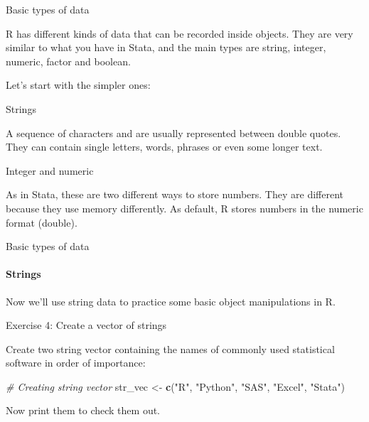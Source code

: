 \documentclass[ignorenonframetext,]{beamer}
\newenvironment{Shaded}{\begin{snugshade}}{\end{snugshade}}
\newcommand{\KeywordTok}[1]{\textcolor[rgb]{0.13,0.29,0.53}{\textbf{#1}}}
\newcommand{\StringTok}[1]{\textcolor[rgb]{0.31,0.60,0.02}{#1}}
\newcommand{\CommentTok}[1]{\textcolor[rgb]{0.56,0.35,0.01}{\textit{#1}}}
\newcommand{\NormalTok}[1]{#1}
\begin{document}
\begin{frame}{Basic types of data}

R has different kinds of data that can be recorded inside objects. They
are very similar to what you have in Stata, and the main types are
string, integer, numeric, factor and boolean.

Let's start with the simpler ones:

\begin{block}{Strings}

A sequence of characters and are usually represented between double
quotes. They can contain single letters, words, phrases or even some
longer text.

\end{block}

\begin{block}{Integer and numeric}

As in Stata, these are two different ways to store numbers. They are
different because they use memory differently. As default, R stores
numbers in the numeric format (double).

\end{block}

\end{frame}

\begin{frame}[fragile]{Basic types of data}

\framesubtitle{Strings}

Now we'll use string data to practice some basic object manipulations in
R.

\begin{block}{Exercise 4: Create a vector of strings}

Create two string vector containing the names of commonly used
statistical software in order of importance:

\begin{Shaded}
\begin{Highlighting}[]
\CommentTok{# Creating string vector}
\NormalTok{str_vec <-}\StringTok{ }\KeywordTok{c}\NormalTok{(}\StringTok{"R"}\NormalTok{,}
             \StringTok{"Python"}\NormalTok{,}
             \StringTok{"SAS"}\NormalTok{,}
             \StringTok{"Excel"}\NormalTok{,}
             \StringTok{"Stata"}\NormalTok{)}
\end{Highlighting}
\end{Shaded}

Now print them to check them out.

\end{block}

\end{frame}
\end{document}
